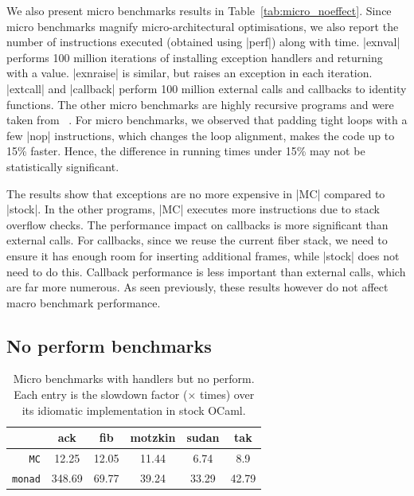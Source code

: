 \documentclass[sigplan,screen]{acmart}
\begin{document}
We also present micro benchmarks results in Table~\ref{tab:micro_noeffect}.
Since micro benchmarks magnify micro-architectural optimisations, we also
report the number of instructions executed (obtained using |perf|) along with
time. |exnval| performs 100 million iterations of installing exception handlers
and returning with a value. |exnraise| is similar, but raises an exception in
each iteration. |extcall| and |callback| perform 100 million external calls and
callbacks to identity functions. The other micro benchmarks are highly
recursive programs and were taken from ~\cite{Farvardin20}. For micro
benchmarks, we observed that padding tight loops with a few |nop| instructions,
which changes the loop alignment, makes the code up to 15\% faster. Hence, the
difference in running times under 15\% may not be statistically significant.

The results show that exceptions are no more expensive in |MC| compared to
|stock|. In the other programs, |MC| executes more instructions due to stack
overflow checks. The performance impact on callbacks is more significant than
external calls. For callbacks, since we reuse the current fiber stack, we need
to ensure it has enough room for inserting additional frames, while |stock|
does not need to do this. Callback performance is less important than external
calls, which are far more numerous. As seen previously, these results however
do not affect macro benchmark performance.

\subsection{No perform benchmarks}

\begin{table}
\caption{Micro benchmarks with handlers but no perform. Each entry is the
	slowdown factor ($\times$ times) over its idiomatic implementation in stock OCaml.}
{
\begin{tabular}{r c c c c c}
	& \textbf{ack} & \textbf{fib} & \textbf{motzkin} & \textbf{sudan} & \textbf{tak} \\ \hline
	\texttt{MC} 	 	& 12.25 & 12.05 & 11.44 & 6.74 & 8.9 \\
	\texttt{monad} 	& 348.69 & 69.77 & 39.24 & 33.29 & 42.79 \\ \hline
\end{tabular}
}
\label{tab:micro_noperform}
\end{table}
\end{document}

